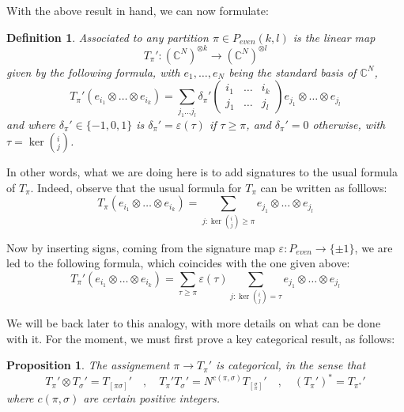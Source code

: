 \documentclass[12pt]{amsbook}
\newtheorem{definition}[theorem]{Definition}
\newtheorem{proposition}[theorem]{Proposition}
\begin{document}
With the above result in hand, we can now formulate:


\begin{definition}
Associated to any partition $\pi\in P_{even}(k,l)$ is the linear map
$$T_\pi':(\mathbb C^N)^{\otimes k}\to(\mathbb C^N)^{\otimes l}$$
given by the following formula, with $e_1,\ldots,e_N$ being the standard basis of $\mathbb C^N$,
$$T_\pi'(e_{i_1}\otimes\ldots\otimes e_{i_k})=\sum_{j_1\ldots j_l}\delta_\pi'\begin{pmatrix}i_1&\ldots&i_k\\ j_1&\ldots&j_l\end{pmatrix}e_{j_1}\otimes\ldots\otimes e_{j_l}$$
and where $\delta_\pi'\in\{-1,0,1\}$ is $\delta_\pi'=\varepsilon(\tau)$ if $\tau\geq\pi$, and $\delta_\pi'=0$ otherwise, with $\tau=\ker(^i_j)$.
\end{definition}

In other words, what we are doing here is to add signatures to the usual formula of $T_\pi$. Indeed, observe that the usual formula for $T_\pi$ can be written as folllows:
$$T_\pi(e_{i_1}\otimes\ldots\otimes e_{i_k})=\sum_{j:\ker(^i_j)\geq\pi}e_{j_1}\otimes\ldots\otimes e_{j_l}$$

Now by inserting signs, coming from the signature map $\varepsilon:P_{even}\to\{\pm1\}$, we are led to the following formula, which coincides with the one given above:
$$T_\pi'(e_{i_1}\otimes\ldots\otimes e_{i_k})=\sum_{\tau\geq\pi}\varepsilon(\tau)\sum_{j:\ker(^i_j)=\tau}e_{j_1}\otimes\ldots\otimes e_{j_l}$$

We will be back later to this analogy, with more details on what can be done with it. For the moment, we must first prove a key categorical result, as follows:

\begin{proposition}
The assignement $\pi\to T_\pi'$ is categorical, in the sense that
$$T_\pi'\otimes T_\sigma'=T_{[\pi\sigma]}'\quad,\quad 
T_\pi'T_\sigma'=N^{c(\pi,\sigma)}T_{[^\sigma_\pi]}'\quad,\quad
(T_\pi')^*=T_{\pi^*}'$$
where $c(\pi,\sigma)$ are certain positive integers.
\end{proposition}
\end{document}
